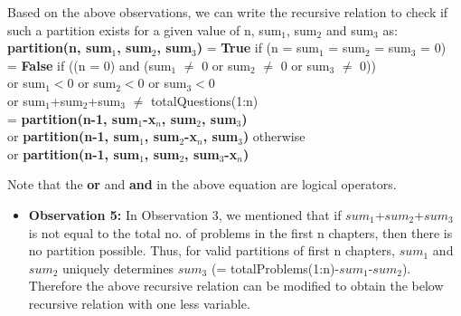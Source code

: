 \documentclass{article}
\begin{document}
Based on the above observations, we can write the recursive relation to check if such a partition exists for a given value of n, sum$_{1}$, sum$_{2}$ and sum$_{3}$ as:
\\
\textbf{partition(n, sum$_{1}$, sum$_{2}$, sum$_{3}$) }=\textbf{ True} \hspace{0.7cm} if (n = sum$_{1}$ = sum$_{2}$ = sum$_{3}$ = 0)
\\\indent  \hspace{5cm}     = \textbf{False} \hspace{0.7cm} if ((n = 0) and (sum$_{1}$ $\neq$ 0 or sum$_{2}$ $\neq$ 0 or sum$_{3}$ $\neq$ 0))
\\\indent  \hspace{7.2cm} or sum$_{1}<0$ or sum$_{2}<0$ or sum$_{3}<0$ 
\\\indent  \hspace{7.2cm} or sum$_{1}$+sum$_{2}$+sum$_{3}$ $\neq$ totalQuestions(1:n)
\\\indent  \hspace{5cm}     = \textbf{partition(n-1, sum$_{1}$-x$_{n}$, sum$_{2}$, sum$_{3}$) }
\\\indent  \hspace{5.5cm}or \textbf{partition(n-1, sum$_{1}$, sum$_{2}$-x$_{n}$, sum$_{3}$) } \hspace{0.7cm} otherwise
\\\indent  \hspace{5.5cm}or \textbf{partition(n-1, sum$_{1}$, sum$_{2}$, sum$_{3}$-x$_{n}$)}

Note that the \textbf{or} and \textbf{and} in the above equation are logical operators.

\begin{itemize}
\item \textbf{Observation 5:} In Observation 3, we mentioned that if $sum_1$+$sum_2$+$sum_3$ is not equal to the total no. of problems in the first n chapters, then there is no partition possible. Thus, for valid partitions of first n chapters, $sum_1$ and $sum_2$ uniquely determines $sum_3$ (= totalProblems(1:n)-$sum_1$-$sum_2$). Therefore the above recursive relation can be modified to obtain the below recursive relation with one less variable.
\end{itemize}
\end{document}
